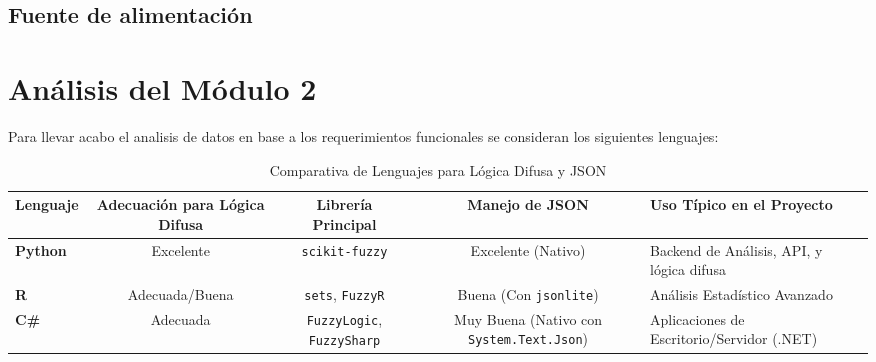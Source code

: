 \subsection{Fuente de alimentación}

\section{Análisis del Módulo 2}
Para llevar acabo el analisis de datos en base a los requerimientos funcionales se 
consideran los siguientes lenguajes:
\begin{table}[h]
    \centering
    \caption{Comparativa de Lenguajes para Lógica Difusa y JSON}
    \label{tab:lenguajes_fuzzy}
    \begin{tabular}{|l|c|c|c|l|}
        \hline
        \textbf{Lenguaje} & \textbf{Adecuación para Lógica Difusa} & \textbf{Librería Principal} & \textbf{Manejo de JSON} & \textbf{Uso Típico en el Proyecto} \\
        \hline
        \textbf{Python} & Excelente & \texttt{scikit-fuzzy} & Excelente (Nativo) & Backend de Análisis, API, y lógica difusa \\
        \hline
        \textbf{R} & Adecuada/Buena & \texttt{sets}, \texttt{FuzzyR} & Buena (Con \texttt{jsonlite}) & Análisis Estadístico Avanzado \\
        \hline
        \textbf{C\#} & Adecuada & \texttt{FuzzyLogic}, \texttt{FuzzySharp} & Muy Buena (Nativo con \texttt{System.Text.Json}) & Aplicaciones de Escritorio/Servidor (.NET) \\
        \hline
    \end{tabular}
\end{table}
